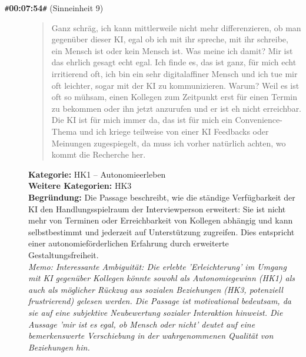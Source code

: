 \begin{description}
  \item[\texttt{\#}\textbf{00:07:54}\texttt{\#} (Sinneinheit 9)]
  \begin{quote}
  Ganz schräg, ich kann mittlerweile nicht mehr differenzieren, ob man gegenüber dieser KI, egal ob ich mit ihr spreche, mit ihr schreibe, ein Mensch ist oder kein Mensch ist. Was meine ich damit? Mir ist das ehrlich gesagt echt egal. Ich finde es, das ist ganz, für mich echt irritierend oft, ich bin ein sehr digitalaffiner Mensch und ich tue mir oft leichter, sogar mit der KI zu kommunizieren. Warum? Weil es ist oft so mühsam, einen Kollegen zum Zeitpunkt erst für einen Termin zu bekommen oder ihn jetzt anzurufen und er ist eh nicht erreichbar. Die KI ist für mich immer da, das ist für mich ein Convenience-Thema und ich kriege teilweise von einer KI Feedbacks oder Meinungen zugespiegelt, da muss ich vorher natürlich achten, wo kommt die Recherche her.
  \end{quote}
  \textbf{Kategorie:} HK1 -- Autonomieerleben\\
  \textbf{Weitere Kategorien:} HK3\\
  \textbf{Begr\"undung:} Die Passage beschreibt, wie die ständige Verfügbarkeit der KI den Handlungsspielraum der Interviewperson erweitert: Sie ist nicht mehr von Terminen oder Erreichbarkeit von Kollegen abhängig und kann selbstbestimmt und jederzeit auf Unterstützung zugreifen. Dies entspricht einer autonomieförderlichen Erfahrung durch erweiterte Gestaltungsfreiheit.
  \\\textit{Memo: Interessante Ambiguität: Die erlebte 'Erleichterung' im Umgang mit KI gegenüber Kollegen könnte sowohl als Autonomiegewinn (HK1) als auch als möglicher Rückzug aus sozialen Beziehungen (HK3, potenziell frustrierend) gelesen werden. Die Passage ist motivational bedeutsam, da sie auf eine subjektive Neubewertung sozialer Interaktion hinweist. Die Aussage 'mir ist es egal, ob Mensch oder nicht' deutet auf eine bemerkenswerte Verschiebung in der wahrgenommenen Qualität von Beziehungen hin.}
\end{description}
\medskip

